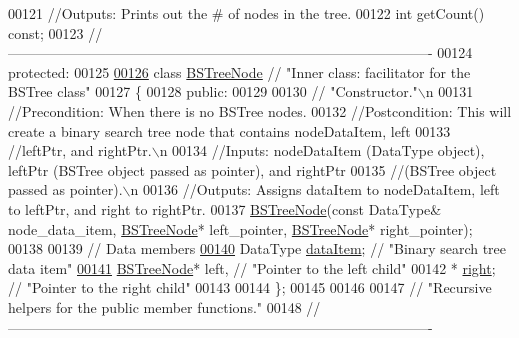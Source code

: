 \begin{DoxyCode}
00121     \textcolor{comment}{//Outputs: Prints out the # of nodes in the tree.}
00122     \textcolor{keywordtype}{int} getCount() \textcolor{keyword}{const};             
00123     \textcolor{comment}{//-------------------------------------------------------------------------------------------}
00124 \textcolor{keyword}{protected}:
00125 
\hypertarget{_b_s_tree_8h_source_l00126}{}\hyperlink{class_b_s_tree_1_1_b_s_tree_node}{00126}     \textcolor{keyword}{class }\hyperlink{class_b_s_tree_1_1_b_s_tree_node}{BSTreeNode}                  \textcolor{comment}{// "Inner class: facilitator for the BSTree class"}
00127     \{
00128     \textcolor{keyword}{public}:
00129 
00130         \textcolor{comment}{// "Constructor."\(\backslash\)n}
00131         \textcolor{comment}{//Precondition: When there is no BSTree nodes. }
00132         \textcolor{comment}{//Postcondition: This will create a binary search tree node that contains nodeDataItem, left}
00133         \textcolor{comment}{//leftPtr, and rightPtr.\(\backslash\)n}
00134         \textcolor{comment}{//Inputs: nodeDataItem (DataType object), leftPtr (BSTree object passed as pointer), and rightPtr}
00135         \textcolor{comment}{//(BSTree object passed as pointer).\(\backslash\)n}
00136         \textcolor{comment}{//Outputs: Assigns dataItem to nodeDataItem, left to leftPtr, and right to rightPtr.}
00137         \hyperlink{class_b_s_tree_1_1_b_s_tree_node}{BSTreeNode}(\textcolor{keyword}{const} DataType& node\_data\_item, \hyperlink{class_b_s_tree_1_1_b_s_tree_node}{BSTreeNode}* left\_pointer, 
      \hyperlink{class_b_s_tree_1_1_b_s_tree_node}{BSTreeNode}* right\_pointer);
00138        
00139         \textcolor{comment}{// Data members}
\hypertarget{_b_s_tree_8h_source_l00140}{}\hyperlink{class_b_s_tree_1_1_b_s_tree_node_a507c8d6dde1b8d35d9af6b4e78f38962}{00140}         DataType \hyperlink{class_b_s_tree_1_1_b_s_tree_node_a507c8d6dde1b8d35d9af6b4e78f38962}{dataItem};         \textcolor{comment}{// "Binary search tree data item"}
\hypertarget{_b_s_tree_8h_source_l00141}{}\hyperlink{class_b_s_tree_1_1_b_s_tree_node_a8d7bfd0208a562c8b8ab332e1d796563}{00141}         \hyperlink{class_b_s_tree_1_1_b_s_tree_node}{BSTreeNode}* left,    \textcolor{comment}{// "Pointer to the left child"}
00142             * \hyperlink{class_b_s_tree_1_1_b_s_tree_node_a8d7bfd0208a562c8b8ab332e1d796563}{right};   \textcolor{comment}{// "Pointer to the right child"}
00143 
00144     \};
00145 
00146     
00147     \textcolor{comment}{// "Recursive helpers for the public member functions."}
00148     \textcolor{comment}{//-------------------------------------------------------------------------------------------}

\end{DoxyCode}
